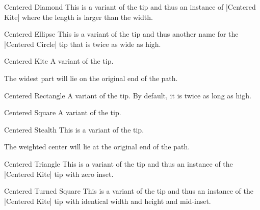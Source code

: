 \begin{multicols}{2}
\begin{arrowtipsimple}{Centered Diamond}
    This is a variant of the  tip and
    thus an instance of |Centered Kite| where the length is larger than the width.
\end{arrowtipsimple}

\begin{arrowtipsimple}{Centered Ellipse}
    This is a variant of the  tip
    and thus another name for the |Centered Circle| tip
    that is twice as wide as high.
\end{arrowtipsimple}

\begin{arrowtipsimple}{Centered Kite}
    A variant of the  tip.
    
    The widest part will lie on the original end of the path.
\end{arrowtipsimple}

\begin{arrowtipsimple}{Centered Rectangle}
    A variant of the  tip.
    By default, it is twice as long as high.
\end{arrowtipsimple}

\begin{arrowtipsimple}{Centered Square}
    A variant of the  tip.
\end{arrowtipsimple}

\begin{arrowtipsimple}{Centered Stealth}
    This is a variant of the  tip.
    
    The weighted center will lie at the original end of the path.
\end{arrowtipsimple}

\begin{arrowtipsimple}{Centered Triangle}
    This is a variant of the  tip and
    thus an instance of the |Centered Kite| tip with zero inset.
\end{arrowtipsimple}

\begin{arrowtipsimple}{Centered Turned Square}
    This is a variant of the  tip and
    thus an instance of the |Centered Kite| tip with identical width and height and mid-inset.
\end{arrowtipsimple}


\end{multicols}
